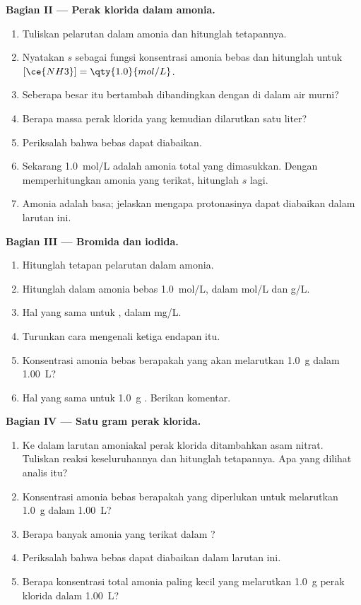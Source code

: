 \begin{problem}
\medskip
\noindent\textbf{Bagian II --- Perak klorida dalam amonia.}
\begin{enumerate}[resume]
  \item Tuliskan pelarutan  dalam amonia dan hitunglah
        tetapannya.
  \item Nyatakan  $s$ sebagai fungsi konsentrasi amonia bebas
        dan hitunglah untuk $[\ce{NH3}] = \qty{1.0}{mol/L}$.
  \item Seberapa besar  itu bertambah dibandingkan dengan di
        dalam air murni?
  \item Berapa massa perak klorida yang kemudian dilarutkan satu liter?
  \item Periksalah bahwa  bebas dapat diabaikan.
  \item Sekarang \qty{1.0}{mol/L} adalah amonia total yang dimasukkan.
        Dengan memperhitungkan amonia yang terikat, hitunglah $s$ lagi.
  \item Amonia adalah basa; jelaskan mengapa protonasinya dapat diabaikan
        dalam larutan ini.
\end{enumerate}

\medskip
\noindent\textbf{Bagian III --- Bromida dan iodida.}
\begin{enumerate}[resume]
  \item Hitunglah tetapan pelarutan  dalam amonia.
  \item Hitunglah   dalam amonia bebas
        \qty{1.0}{mol/L}, dalam \unit{mol/L} dan \unit{g/L}.
  \item Hal yang sama untuk , dalam \unit{mg/L}.
  \item Turunkan cara mengenali ketiga endapan itu.
  \item Konsentrasi amonia bebas berapakah yang akan melarutkan
        \qty{1.0}{g}  dalam \qty{1.00}{L}?
  \item Hal yang sama untuk \qty{1.0}{g} . Berikan komentar.
\end{enumerate}

\medskip
\noindent\textbf{Bagian IV --- Satu gram perak klorida.}
\begin{enumerate}[resume]
  \item Ke dalam larutan amoniakal perak klorida ditambahkan asam nitrat.
        Tuliskan reaksi keseluruhannya dan hitunglah tetapannya. Apa yang
        dilihat analis itu?
  \item Konsentrasi amonia bebas berapakah yang diperlukan untuk
        melarutkan \qty{1.0}{g}  dalam \qty{1.00}{L}?
  \item Berapa banyak amonia yang terikat dalam ?
  \item Periksalah bahwa  bebas dapat diabaikan dalam larutan ini.
  \item Berapa konsentrasi total amonia paling kecil yang melarutkan
        \qty{1.0}{g} perak klorida dalam \qty{1.00}{L}?
\end{enumerate}
\end{problem}
